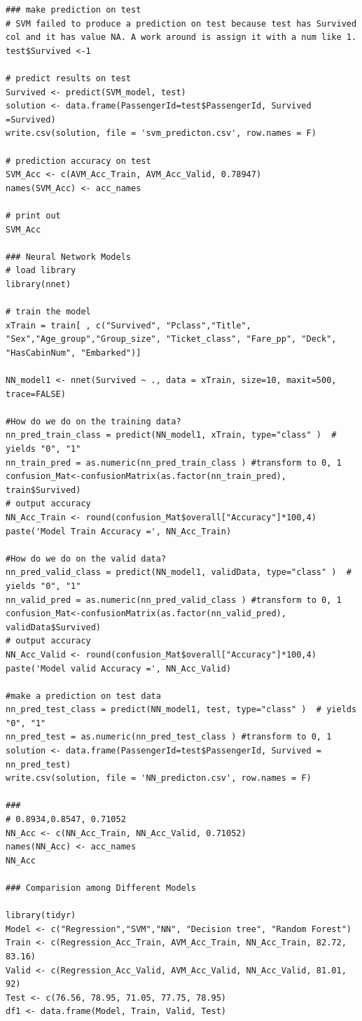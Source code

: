 \documentclass[
]{book}
\begin{document}
\begin{verbatim}
### make prediction on test
# SVM failed to produce a prediction on test because test has Survived col and it has value NA. A work around is assign it with a num like 1.
test$Survived <-1

# predict results on test
Survived <- predict(SVM_model, test)
solution <- data.frame(PassengerId=test$PassengerId, Survived =Survived)
write.csv(solution, file = 'svm_predicton.csv', row.names = F)

# prediction accuracy on test
SVM_Acc <- c(AVM_Acc_Train, AVM_Acc_Valid, 0.78947)
names(SVM_Acc) <- acc_names

# print out
SVM_Acc

### Neural Network Models
# load library
library(nnet)

# train the model
xTrain = train[ , c("Survived", "Pclass","Title", "Sex","Age_group","Group_size", "Ticket_class", "Fare_pp", "Deck", "HasCabinNum", "Embarked")]

NN_model1 <- nnet(Survived ~ ., data = xTrain, size=10, maxit=500, trace=FALSE)

#How do we do on the training data?
nn_pred_train_class = predict(NN_model1, xTrain, type="class" )  # yields "0", "1"
nn_train_pred = as.numeric(nn_pred_train_class ) #transform to 0, 1
confusion_Mat<-confusionMatrix(as.factor(nn_train_pred), train$Survived)
# output accuracy
NN_Acc_Train <- round(confusion_Mat$overall["Accuracy"]*100,4)
paste('Model Train Accuracy =', NN_Acc_Train)

#How do we do on the valid data?
nn_pred_valid_class = predict(NN_model1, validData, type="class" )  # yields "0", "1"
nn_valid_pred = as.numeric(nn_pred_valid_class ) #transform to 0, 1
confusion_Mat<-confusionMatrix(as.factor(nn_valid_pred), validData$Survived)
# output accuracy
NN_Acc_Valid <- round(confusion_Mat$overall["Accuracy"]*100,4)
paste('Model valid Accuracy =', NN_Acc_Valid)

#make a prediction on test data
nn_pred_test_class = predict(NN_model1, test, type="class" )  # yields "0", "1"
nn_pred_test = as.numeric(nn_pred_test_class ) #transform to 0, 1
solution <- data.frame(PassengerId=test$PassengerId, Survived = nn_pred_test)
write.csv(solution, file = 'NN_predicton.csv', row.names = F)

###
# 0.8934,0.8547, 0.71052
NN_Acc <- c(NN_Acc_Train, NN_Acc_Valid, 0.71052)
names(NN_Acc) <- acc_names
NN_Acc

### Comparision among Different Models

library(tidyr)
Model <- c("Regression","SVM","NN", "Decision tree", "Random Forest")
Train <- c(Regression_Acc_Train, AVM_Acc_Train, NN_Acc_Train, 82.72, 83.16)
Valid <- c(Regression_Acc_Valid, AVM_Acc_Valid, NN_Acc_Valid, 81.01, 92)
Test <- c(76.56, 78.95, 71.05, 77.75, 78.95)
df1 <- data.frame(Model, Train, Valid, Test)


\end{verbatim}
\end{document}
